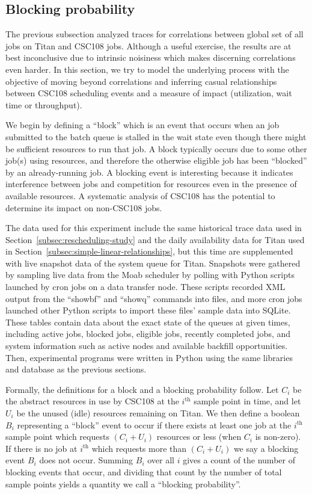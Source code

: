 \subsection{Blocking probability}
\label{subsec:blocking-probability}

The previous subsection analyzed traces for correlations between global set of
all jobs on Titan and CSC108 jobs. Although a useful exercise, the results are
at best inconclusive due to intrinsic noisiness which makes discerning
correlations even harder. In this section, we  try to model the underlying
process with the objective of moving beyond correlations and inferring casual
relationships between CSC108 scheduling events and a measure of impact
(utilization, wait time or throughput).

We begin by defining a ``block'' which is an event that occurs when an job
submitted to the batch queue is stalled in the wait state even though there
might be sufficient resources to run that job. A block typically occurs due to
some other job(s) using resources, and therefore the otherwise eligible job
has been ``blocked'' by an already-running job. A blocking event is
interesting because it indicates interference between jobs and competition for
resources even in the presence of available resources. A systematic analysis
of CSC108 has the potential to determine its impact on non-CSC108 jobs.

The data used for this experiment include the same historical trace data used
in Section~\ref{subsec:rescheduling-study} and the daily availability
data for Titan used in Section~\ref{subsec:simple-linear-relationships}, but
this time are supplemented with live snapshot data of the system queue for
Titan. Snapshots were gathered by sampling live data from the Moab scheduler by
polling with Python scripts launched by cron jobs on a data transfer node.
These scripts recorded XML output from the ``showbf'' and ``showq'' commands
into files, and more cron jobs launched other Python scripts to import these
files' sample data into SQLite. These tables contain data about the exact state
of the queues at given times, including active jobs, blocked jobs, eligible
jobs, recently completed jobs, and system information such as active nodes and
available backfill opportunities. Then, experimental programs were written in
Python using the same libraries and database as the previous sections.

Formally, the definitions for a block and a blocking probability follow. Let
$C_i$ be the abstract resources in use by CSC108 at the $i^{\text{th}}$ sample
point in time, and let $U_i$ be the unused (idle) resources remaining on
Titan. We then define a boolean $B_i$ representing a ``block'' event to occur
if there exists at least one job at the $i^{\text{th}}$ sample point which
requests $(C_i + U_i)$ resources or less (when $C_i$ is non-zero). If there is
no job at $i^{\text{th}}$ which requests more than $(C_i + U_i)$ we say a
blocking event $B_i$  does not occur. Summing $B_i$ over all $i$ gives a count
of the number of blocking events that occur, and dividing that count by the
number of total sample points yields a quantity we call a ``blocking
probability''.

